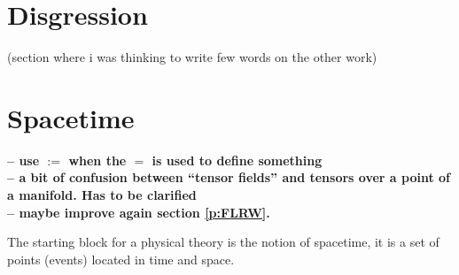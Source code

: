 \documentclass[11pt]{book}
\newcommand{\com}[1]{{\color{red}\bf #1}}
\theoremstyle{break}
\begin{document}




\chapter*{Disgression}


(section where i was thinking to write few words on the other work)






\chapter{Spacetime}
\label{p:SPACETIME}


\com{
-- use $:=$ when the $=$ is used to define something \\[4pt]
-- a bit of confusion between ``tensor fields'' and tensors over a point of a manifold. Has to be clarified \\[4pt]
-- maybe improve again section \ref{p:FLRW}.
}


\bigskip

The starting block for a physical theory is the notion of spacetime, it is a set of points (events) located in time and space. 
\end{document}
